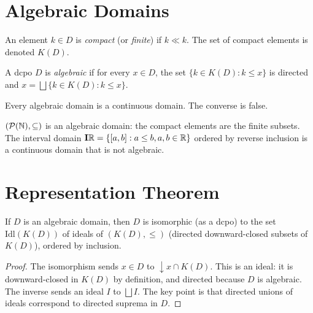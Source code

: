 \section{Algebraic Domains}

\begin{definition}
An element $k \in D$ is \emph{compact} (or \emph{finite}) if $k \ll k$. The set of
compact elements is denoted $K(D)$.
\end{definition}

\begin{definition}
A dcpo $D$ is \emph{algebraic} if for every $x \in D$, the set
$\{k \in K(D) : k \leq x\}$ is directed and $x = \bigsqcup\{k \in K(D) : k \leq x\}$.
\end{definition}

\begin{proposition}
Every algebraic domain is a continuous domain. The converse is false.
\end{proposition}

\begin{example}
$(\mathcal{P}(\mathbb{N}), \subseteq)$ is an algebraic domain: the compact elements are the finite
subsets. The interval domain $\mathbf{I}\mathbb{R} = \{[a,b] : a \leq b, a,b \in \mathbb{R}\}$ ordered by
reverse inclusion is a continuous domain that is not algebraic.
\end{example}

\section{Representation Theorem}

\begin{theorem}
If $D$ is an algebraic domain, then $D$ is isomorphic (as a dcpo) to the set
$\mathrm{Idl}(K(D))$ of ideals of $(K(D), \leq)$ (directed downward-closed subsets of
$K(D)$), ordered by inclusion.
\end{theorem}

\begin{proof}
The isomorphism sends $x \in D$ to $\downarrow\! x \cap K(D)$. This is an ideal: it is
downward-closed in $K(D)$ by definition, and directed because $D$ is algebraic. The
inverse sends an ideal $I$ to $\bigsqcup I$. The key point is that directed unions of
ideals correspond to directed suprema in $D$.
\end{proof}

